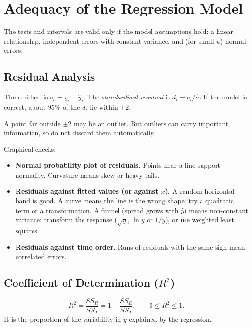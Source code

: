 \section{Adequacy of the Regression Model}

The tests and intervals are valid only if the model assumptions hold: a linear relationship, independent errors with constant variance, and (for small $n$) normal errors.

\subsection{Residual Analysis}

\begin{definition}[Residuals]
The residual is $e_i=y_i-\hat{y}_i$. The \emph{standardised residual} is $d_i=e_i/\hat\sigma$. If the model is correct, about $95\%$ of the $d_i$ lie within $\pm2$.
\end{definition}

A point far outside $\pm2$ may be an outlier. But outliers can carry important information, so do not discard them automatically.

Graphical checks:
\begin{itemize}
  \item \textbf{Normal probability plot of residuals.} Points near a line support normality. Curvature means skew or heavy tails.
  \item \textbf{Residuals against fitted values (or against $x$).} A random horizontal band is good. A curve means the line is the wrong shape: try a quadratic term or a transformation. A funnel (spread grows with $\hat{y}$) means non-constant variance: transform the response ($\sqrt{y}$, $\ln y$ or $1/y$), or use weighted least squares.
  \item \textbf{Residuals against time order.} Runs of residuals with the same sign mean correlated errors.
\end{itemize}

\subsection{Coefficient of Determination ($R^2$)}\label{sec:regr2}

\begin{definition}[$R^2$]
\[ R^2=\frac{SS_R}{SS_T}=1-\frac{SS_E}{SS_T},\qquad 0\le R^2\le1. \]
It is the proportion of the variability in $y$ explained by the regression.
\end{definition}

